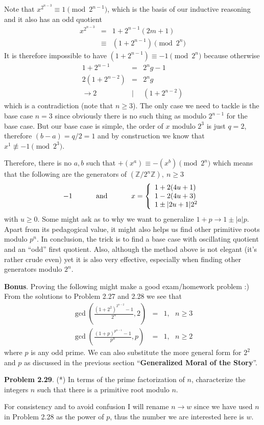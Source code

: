 \documentclass[aps,preprint,preprintnumbers,nofootinbib,showpacs,prd]{revtex4-1}
\newcommand{\ba}{\begin{array}}
\newcommand{\ea}{\end{array}}
\newcommand{\nbea}{\begin{eqnarray*}}
\newcommand{\neea}{\end{eqnarray*}}
\begin{document}
Note that $x^{2^{n-3}} \equiv 1 \pmod{2^{n-1}}$, which is the basis of our inductive reasoning and it also has an odd quotient
%
\nbea
x^{2^{n-3}} & = & 1 + 2^{n-1}(2m+1) \\
& \equiv & (1 + 2^{n-1}) \pmod{2^n}
\neea
%
It is therefore impossible to have $(1 + 2^{n-1}) \equiv -1 \pmod{2^n}$ because otherwise
%
\nbea
1 + 2^{n-1} & = & 2^n g - 1 \\
2(1 + 2^{n-2}) & = & 2^n g \\
\to 2 & | & (1 + 2^{n-2})
\neea
%
which is a contradiction (note that $n \ge 3$). The only case we need to tackle is the base case $n=3$ since obviously there is no such thing as modulo $2^{n-1}$ for the base case. But our base case is simple, the order of $x$ modulo $2^3$ is just $q = 2$, therefore $(b-a) = q/2 = 1$ and by construction we know that $x^1 \not\equiv -1 \pmod{2^3}$.

Therefore, there is no $a,b$ such that $+(x^a) \equiv -(x^b) \pmod{2^n}$ which means that the following are the generators of $(\mathbb{Z}/2^n\mathbb{Z}),~n \ge 3$
%
\nbea
-1 ~~~~~~~~~~{\rm and}~~~~~~~~~~
x =  \left \{ \ba{l}
1 + 2(4u+1)  \\
1 - 2(4u+3) \\
1 \pm |2u+1|2^2
\ea
\right.
\neea
%
with $u \ge 0$. Some might ask as to why we want to generalize $1 + p \to 1 \pm |a|p$. Apart from its pedagogical value, it might also helps us find other primitive roots modulo $p^n$. In conclusion, the trick is to find a base case with oscillating quotient and an ``odd'' first quotient. Also, although the method above is not elegant (it's rather crude even) yet it is also very effective, especially when finding other generators modulo $2^n$.

{\bf Bonus}. Proving the following might make a good exam/homework problem :) From the solutions to Problem 2.27 and 2.28 we see that
%
\nbea
\gcd\left( \frac{(1 + 2^2)^{2^{n-2}} - 1}{2^n}, 2 \right ) & = & 1, ~~~ n \ge 3 \\
\gcd\left( \frac{(1 + p)^{p^{n-1}} - 1}{p^n}, p \right ) & = & 1, ~~~ n \ge 2
\neea
%
where $p$ is any odd prime. We can also substitute the more general form for $2^2$ and $p$ as discussed in the previous section ``{\bf Generalized Moral of the Story}''.

{\bf Problem 2.29}. (*) In terms of the prime factorization of $n$, characterize the integers $n$ such that there is a primitive root modulo $n$.

For consistency and to avoid confusion I will rename $n \to w$ since we have used $n$ in Problem 2.28 as the power of $p$, thus the number we are interested here is $w$.
\end{document}

